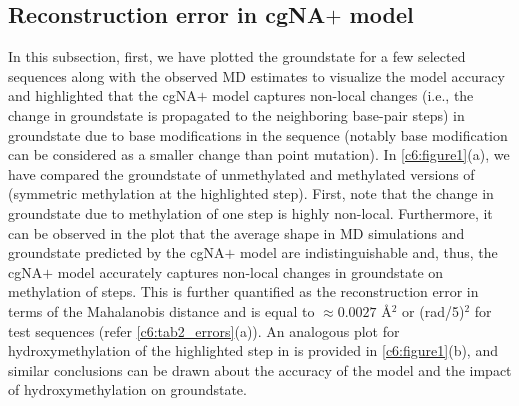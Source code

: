 \subsection{Reconstruction error in cgNA$+$ model}\label{c6:res_error_sec}
In this subsection, first, we have plotted the groundstate for a few selected sequences along with the observed MD estimates to visualize the model accuracy and highlighted that the cgNA$+$ model captures non-local changes (i.e., the change in groundstate is propagated to the neighboring base-pair steps) in groundstate due to base modifications in the sequence (notably base modification can be considered as a smaller change than point mutation).
In \cref{c6:figure1}(a), we have compared the groundstate of unmethylated and methylated versions of  (symmetric methylation at the highlighted \cpg step). 
First, note that the change in groundstate due to methylation of one \cpg step is highly non-local. 
Furthermore, it can be observed in the plot that the average shape in MD simulations and groundstate predicted by the cgNA$+$ model are indistinguishable and, thus, the cgNA$+$ model accurately captures non-local changes in groundstate on methylation of \cpg steps. 
This is further quantified as the reconstruction error in terms of the Mahalanobis distance and is equal to $\approx 0.0027$ \AA$^2$ or (rad/5)$^2$ for test sequences (refer \cref{c6:tab2_errors}(a)).
An analogous plot for hydroxymethylation of the highlighted \cpg step in  is provided in \cref{c6:figure1}(b), and similar conclusions can be drawn about the accuracy of the model and the impact of \cpg hydroxymethylation on groundstate.

